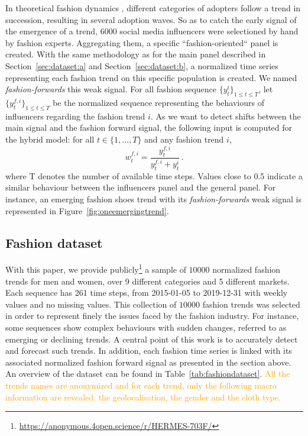 \documentclass[10pt]{article} %
\newcommand{\ts}{y}
\newcommand{\ws}{w}
\newcommand{\numberts}{10000}
\begin{document}
In theoretical fashion dynamics \citep{rogers1962}, different categories of adopters follow a trend in succession, resulting in several adoption waves.
So as to catch the early signal of the emergence of a trend, 6000 social media influencers were selectioned by hand by fashion experts. Aggregating them, a specific ``fashion-oriented`` panel is created. With the same methodology as for the main panel described in Section~\ref{sec:dataset:a} and Section~\ref{sec:dataset:b}, a normalized time series representing each fashion trend on this specific population is created. We named \textit{fashion-forwards} this weak signal.  For all fashion sequence $\{y^i_t\}_{1 \leq t \leq T}$, let $\{\ts^{f,i}_t\}_{1 \leq t \leq T}$ be the normalized sequence representing the behaviours of influencers regarding the fashion trend $i$. As we want to detect shifts between the main signal and the fashion forward signal, the following input is computed for the hybrid model: for all $t \in \{1,\ldots,T\}$ and any fashion trend $i$,
$$
\ws^{f,i}_{t} = \frac{\ts_t^{f,i}}{\ts_t^{f,i}+\ts_t^{i}}\,.
$$
where T denotes the number of available time steps. Values close to 0.5 indicate a similar behaviour between the influencers panel and the general panel. For instance, an  emerging fashion shoes trend with its \textit{fashion-forwards} weak signal is represented in Figure~\ref{fig:oneemergingtrend}. 

\subsection{Fashion dataset}

With this paper, we provide publicly\footnote[1]{\url{https://anonymous.4open.science/r/HERMES-703F/}} a sample of $\numberts$ normalized fashion trends for men and women, over 9 different categories and 5 different markets. Each sequence has 261 time steps, from 2015-01-05 to 2019-12-31 with weekly values and no missing values. This collection of $\numberts$ fashion trends was selected in order to represent finely the issues faced by the fashion industry. For instance, some sequences show complex behaviours with sudden changes, referred to as emerging or declining trends. A central point of this work is to accurately detect and forecast such trends. In addition, each fashion time series is linked with its associated normalized fashion forward signal as presented in the section above. An overview of the dataset can be found in Table~\ref{tab:fashiondataset}. \textcolor{orange}{All the trends names are anonymized and for each trend, only the following macro information are revealed: the geolocalisation, the gender and the cloth type.}
\end{document}
